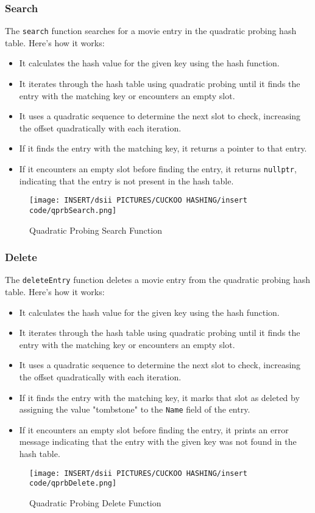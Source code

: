 \documentclass[12pt]{article}
\begin{document}
\subsubsection{Search}
The \texttt{search} function searches for a movie entry in the quadratic probing hash table. Here's how it works:
\begin{itemize}
    \item It calculates the hash value for the given key using the hash function.
    \item It iterates through the hash table using quadratic probing until it finds the entry with the matching key or encounters an empty slot.
    \item It uses a quadratic sequence to determine the next slot to check, increasing the offset quadratically with each iteration.
    \item If it finds the entry with the matching key, it returns a pointer to that entry.
    \item If it encounters an empty slot before finding the entry, it returns \texttt{nullptr}, indicating that the entry is not present in the hash table.
\end{itemize}
\begin{figure}[htbp]
    \centering
    \texttt{[image: INSERT/dsii PICTURES/CUCKOO HASHING/insert code/qprbSearch.png]}
    \caption{Quadratic Probing Search Function}
    \label{fig:insertion_step1}
\end{figure}
\newpage
\subsubsection{Delete}
The \texttt{deleteEntry} function deletes a movie entry from the quadratic probing hash table. Here's how it works:
\begin{itemize}
    \item It calculates the hash value for the given key using the hash function.
    \item It iterates through the hash table using quadratic probing until it finds the entry with the matching key or encounters an empty slot.
    \item It uses a quadratic sequence to determine the next slot to check, increasing the offset quadratically with each iteration.
    \item If it finds the entry with the matching key, it marks that slot as deleted by assigning the value "tombstone" to the \texttt{Name} field of the entry.
    \item If it encounters an empty slot before finding the entry, it prints an error message indicating that the entry with the given key was not found in the hash table.
\end{itemize}
\begin{figure}[htbp]
    \centering
    \texttt{[image: INSERT/dsii PICTURES/CUCKOO HASHING/insert code/qprbDelete.png]}
    \caption{Quadratic Probing Delete Function}
    \label{fig:insertion_step1}
\end{figure}
\end{document}
